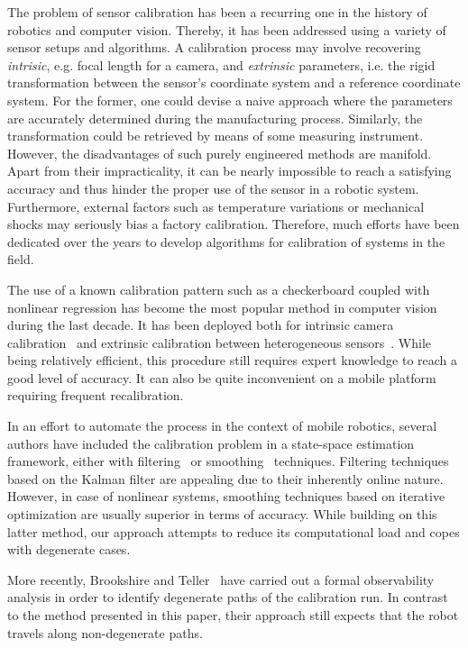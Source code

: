 

The problem of sensor calibration has been a recurring one in the history of
robotics and computer vision. Thereby, it has been addressed using a
variety of sensor setups and algorithms. A calibration process may involve
recovering \emph{intrisic}, e.g. focal length for a camera, and \emph{extrinsic}
parameters, i.e. the rigid transformation between the sensor's coordinate system
and a reference coordinate system. For the former, one could devise a naive
approach where the parameters are accurately determined during the manufacturing
process. Similarly, the transformation could be retrieved by means of
some measuring instrument. However, the disadvantages of such purely
engineered methods are manifold. Apart from their impracticality, it can be
nearly impossible to reach a satisfying accuracy and thus hinder the proper use
of the sensor in a robotic system. Furthermore, external factors such as
temperature variations or mechanical shocks may seriously bias a factory
calibration. Therefore, much efforts have been dedicated over the years to
develop algorithms for calibration of systems in the field.

The use of a known calibration pattern such as a checkerboard coupled with
nonlinear regression has become the most popular method in computer vision
during the last decade. It has been deployed both for intrinsic camera
calibration~\cite{sturm99plane} and extrinsic calibration
between heterogeneous sensors~\cite{zhang04extrinsic}. While being relatively
efficient, this procedure still requires expert knowledge to reach a good level
of accuracy. It can also be quite inconvenient on a mobile platform requiring
frequent recalibration.

In an effort to automate the process in the context of mobile robotics, several
authors have included the calibration problem in a state-space estimation
framework, either with filtering~\cite{martinelli06automatic} or
smoothing~\cite{kuemmerle11simultaneous} techniques. Filtering techniques based
on the Kalman filter are appealing due to their inherently online nature.
However, in case of nonlinear systems, smoothing techniques based on iterative
optimization are usually superior in terms of accuracy. While building on this
latter method, our approach attempts to reduce its computational load and copes
with degenerate cases.

More recently, Brookshire and Teller~\cite{brookshire12extrinsic} have carried
out a formal observability analysis in order to identify degenerate paths of
the calibration run. In contrast to the method presented in this paper, their
approach still expects that the robot travels along non-degenerate paths.

